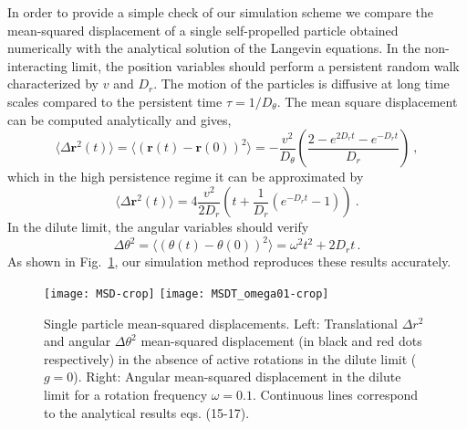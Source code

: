 \documentclass[aps,twocolumn,showlabels,showrefs,amsmath,amssymb,pre,superscriptaddress, floatfix, colors]{revtex4}
\newcommand{\1}{\begin{equation}}
\newcommand{\2}{\end{equation}}
\newcommand{\4}[2]{{\frac{#1}{#2}}}
\begin{document}
In order to provide a simple check  of our simulation scheme we compare the mean-squared displacement of a single self-propelled particle obtained numerically with the analytical solution of the Langevin equations.  In the non-interacting limit, the position variables should perform a persistent random walk characterized by $v$ and $D_r$. The motion of the particles is diffusive at long time scales compared to the persistent time $\tau=1/D_{\theta}$. The mean square displacement can be computed analytically and gives,
\begin{equation}\label{eq:MSDdilute}
\langle \Delta \boldsymbol{r}^2(t)\rangle=\langle(\boldsymbol{r}(t)-\boldsymbol{r}(0))^2 \rangle=-\frac{v^2}{D_{\theta}}\left(\frac{2-e^{2D_rt} - e^{-D_rt}}{D_r}\right) \ , 
\end{equation}
which in the high persistence regime it can be approximated by
\begin{equation}\label{eq:MSDdilute}
\langle \Delta \boldsymbol{r}^2(t)\rangle=4\frac{v^2}{2D_r}\left( t+ \frac{1}{D_r}(e^{-D_rt}-1)\right) \ .
\end{equation}
In the dilute limit, the angular variables should verify
\begin{equation}
 \Delta \theta^2=\langle(\theta(t)-\theta(0))^2 \rangle=\omega^2 t^2+2D_rt \, .
\end{equation}
As shown in Fig.~\ref{fig:MSD}, our simulation method reproduces these results accurately. 
\begin{figure}
\begin{center}
\texttt{[image: MSD-crop]}
\texttt{[image: MSDT\_omega01-crop]}
\end{center}
\caption{Single particle mean-squared displacements. Left: Translational $\Delta r^2$ and angular $\Delta \theta^2$ mean-squared displacement (in black and red dots respectively) in the absence of active rotations in the dilute limit ($g=0$).  Right: Angular  mean-squared displacement in the dilute limit for a rotation frequency $\omega=0.1$. Continuous lines correspond to the analytical results eqs. (15-17).} 
\label{fig:MSD}
\end{figure}
\end{document}
